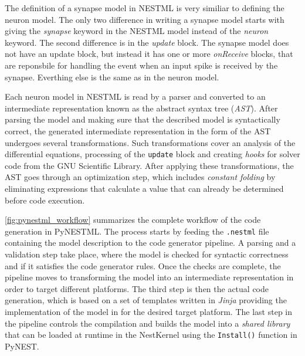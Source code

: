 The definition of a synapse model in NESTML is very similiar to defining the neuron model. The only two difference in writing a synapse model starts with giving the \emph{synapse} keyword in the NESTML model instead of the \emph{neuron} keyword. The second difference is in the \emph{update} block. The synapse model does not have an update block, but instead it has one or more \emph{onReceive} blocks, that are reponsbile for handling the event when an input spike is received by the synapse. Everthing else is the same as in the neuron model.

Each neuron model in NESTML is read by a parser and converted to an intermediate representation known as the abstract syntax tree (\emph{AST}). After parsing the model and making sure that the described model is syntactically correct, the generated intermediate representation in the form of the AST undergoes several transformations. Such transformations cover an analysis of the differential equations, processing of the \texttt{update} block and creating \emph{hooks} for solver code from the GNU Scientific Library. After applying these transformations, the AST goes through an optimization step, which includes \emph{constant folding} by eliminating expressions that calculate a value that can already be determined before code execution.

\autoref{fig:pynestml_workflow} summarizes the complete workflow of the code generation in PyNESTML. The process starts by feeding the \texttt{.nestml} file containing the model description to the code generator pipeline. A parsing and a validation step take place, where the model is checked for syntactic correctness and if it satisfies the code generator rules. Once the checks are complete, the pipeline moves to transforming the model into an intermediate representation in order to target different platforms. The third step is then the actual code generation, which is based on a set of templates written in \emph{Jinja} \citep{jinja} providing the implementation of the model in for the desired target platform. The last step in the pipeline controls the compilation and builds the model into a \emph{shared library} that can be loaded at runtime in the NestKernel using the \texttt{Install()} function in PyNEST.

